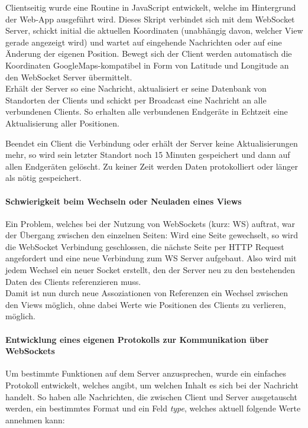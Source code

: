 Clientseitig wurde eine Routine in JavaScript entwickelt, welche im Hintergrund der Web-App ausgeführt wird. Dieses Skript verbindet sich mit dem WebSocket Server, schickt initial die aktuellen Koordinaten (unabhängig davon, welcher View gerade angezeigt wird) und wartet auf eingehende Nachrichten oder auf eine Änderung der eigenen Position. Bewegt sich der Client werden automatisch die Koordinaten GoogleMaps-kompatibel in Form von Latitude und Longitude an den WebSocket Server übermittelt.\\
Erhält der Server so eine Nachricht, aktualisiert er seine Datenbank von Standorten der Clients und schickt per Broadcast eine Nachricht an alle verbundenen Clients. So erhalten alle verbundenen Endgeräte in Echtzeit eine Aktualisierung aller Positionen.\par

Beendet ein Client die Verbindung oder erhält der Server keine Aktualisierungen mehr, so wird sein letzter Standort noch 15 Minuten gespeichert und dann auf allen Endgeräten gelöscht. Zu keiner Zeit werden Daten protokolliert oder länger als nötig gespeichert.\par

\paragraph{Schwierigkeit beim Wechseln oder Neuladen eines Views}
Ein Problem, welches bei der Nutzung von WebSockets (kurz: WS) auftrat, war der Übergang zwischen den einzelnen Seiten: Wird eine Seite gewechselt, so wird die WebSocket Verbindung geschlossen, die nächste Seite per HTTP Request angefordert und eine neue Verbindung zum WS Server aufgebaut. Also wird mit jedem Wechsel ein neuer Socket erstellt, den der Server neu zu den bestehenden Daten des Clients referenzieren muss.\\
Damit ist nun durch neue Assoziationen von Referenzen ein Wechsel zwischen den Views möglich, ohne dabei Werte wie Positionen des Clients zu verlieren, möglich.

\paragraph{Entwicklung eines eigenen Protokolls zur Kommunikation über WebSockets}
Um bestimmte Funktionen auf dem Server anzusprechen, wurde ein einfaches Protokoll entwickelt, welches angibt, um welchen Inhalt es sich bei der Nachricht handelt. So haben alle Nachrichten, die zwischen Client und Server ausgetauscht werden, ein bestimmtes Format und ein Feld \emph{type}, welches aktuell folgende Werte annehmen kann:

